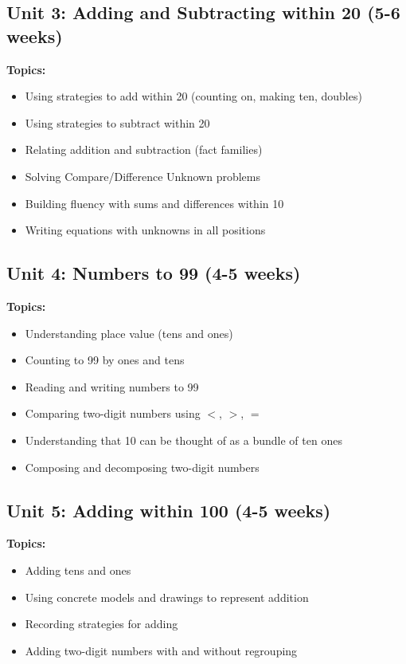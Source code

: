 \documentclass[11pt,letterpaper]{report}
\begin{document}
\subsection{Unit 3: Adding and Subtracting within 20 (5-6 weeks)}

\textbf{Topics:}
\begin{itemize}
    \item Using strategies to add within 20 (counting on, making ten, doubles)
    \item Using strategies to subtract within 20
    \item Relating addition and subtraction (fact families)
    \item Solving Compare/Difference Unknown problems
    \item Building fluency with sums and differences within 10
    \item Writing equations with unknowns in all positions
\end{itemize}

\subsection{Unit 4: Numbers to 99 (4-5 weeks)}

\textbf{Topics:}
\begin{itemize}
    \item Understanding place value (tens and ones)
    \item Counting to 99 by ones and tens
    \item Reading and writing numbers to 99
    \item Comparing two-digit numbers using $<$, $>$, $=$
    \item Understanding that 10 can be thought of as a bundle of ten ones
    \item Composing and decomposing two-digit numbers
\end{itemize}

\subsection{Unit 5: Adding within 100 (4-5 weeks)}

\textbf{Topics:}
\begin{itemize}
    \item Adding tens and ones
    \item Using concrete models and drawings to represent addition
    \item Recording strategies for adding
    \item Adding two-digit numbers with and without regrouping
\end{itemize}
\end{document}
